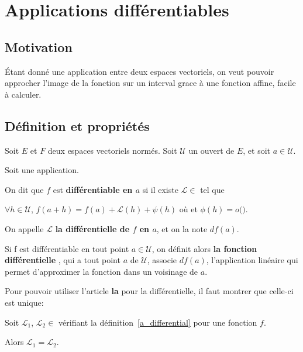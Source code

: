 \chapter{Applications différentiables}
\label{chapter_differential}
\section{Motivation}
	Étant donné une application entre deux espaces vectoriels, on veut pouvoir
	approcher l'image de la fonction sur un interval grace à une fonction
	affine, facile à calculer.


\section{Définition et propriétés}


\begin{definition} 
\label{a_differential}
	Soit $E$ et $F$ deux espaces vectoriels normés.
	Soit $\mathcal{U}$ un ouvert de $E$, et soit $a \in \mathcal{U}$.

	Soit  une application.

	On dit que $f$ est \textbf{différentiable en $a$} si il existe $\mathcal{L}
	\in$  tel que
	
	$\forall h \in \mathcal{U}$,
	$f(a + h) = f(a) + \mathcal{L}(h) + \psi(h)$ où
	et $\phi(h) = o($$)$.

\end{definition}

On appelle $\mathcal{L}$ \textbf{la différentielle de $f$ en $a$}, et on la note
$df(a)$.

Si f est différentiable en tout point $a \in \mathcal{U}$, on définit alors
\textbf{la fonction différentielle}
, qui a tout point $a$
de $\mathcal{U}$, associe $df(a)$, l'application linéaire qui permet
d'approximer la fonction dans un voisinage de $a$.

Pour pouvoir utiliser l'article \textbf{la} pour la différentielle, il faut
montrer que celle-ci est unique:

\begin{proposition}
	Soit $\mathcal{L}_{1}$, $\mathcal{L}_{2} \in$ 
	vérifiant la définition~\ref{a_differential} pour une fonction $f$.

	Alors $\mathcal{L}_{1} = \mathcal{L}_{2}$.
\end{proposition}

